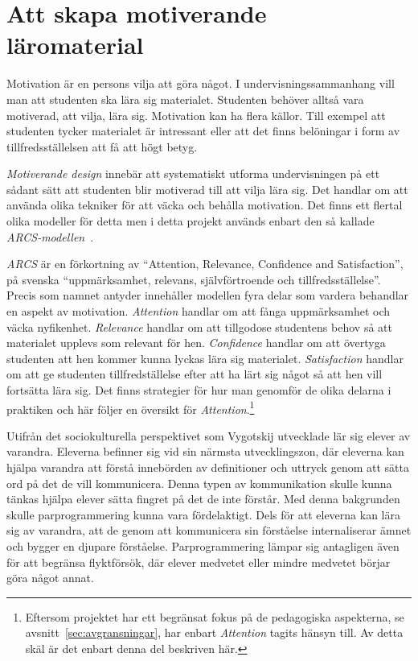 \section{Att skapa motiverande läromaterial}\label{sec:arcs}
\begin{draft}
Motivation är en persons vilja att göra något. I undervisningssammanhang vill
man att studenten ska lära sig materialet. Studenten behöver alltså vara
motiverad, att vilja, lära sig. Motivation kan ha flera källor. Till exempel att
studenten tycker materialet är intressant eller att det finns belöningar i form
av tillfredsställelsen att få att högt betyg. 

\textit{Motiverande design} innebär att systematiskt utforma undervisningen på
ett sådant sätt att studenten blir motiverad till att vilja lära sig. Det handlar om
att använda olika tekniker för att väcka och behålla motivation. Det finns ett
flertal olika modeller för detta men i detta projekt används enbart den så
kallade \textit{ARCS-modellen}~\cite{arcs_book}.

\textit{ARCS} är en förkortning av ``Attention, Relevance, Confidence and
Satisfaction'', på svenska ``uppmärksamhet, relevans, självförtroende och
tillfredsställelse''. Precis som namnet antyder innehåller modellen fyra delar
som vardera behandlar en aspekt av motivation. \textit{Attention} handlar om att
fånga uppmärksamhet och väcka nyfikenhet. \textit{Relevance} handlar om att
tillgodose studentens behov så att materialet upplevs som relevant för hen.
\textit{Confidence} handlar om att övertyga studenten att hen kommer kunna
lyckas lära sig materialet. \textit{Satisfaction} handlar om att ge studenten
tillfredställelse efter att ha lärt sig något så att hen vill fortsätta lära
sig. Det finns strategier för hur man genomför de olika delarna i praktiken och
här följer en översikt för \textit{Attention}.\footnote{Eftersom projektet har
ett begränsat fokus på de pedagogiska aspekterna, se
avsnitt~\ref{sec:avgransningar}, har enbart \textit{Attention}  tagits hänsyn till. Av detta skäl är det enbart denna
del beskriven här.}

Utifrån det sociokulturella perspektivet som Vygotskij utvecklade\cite{LSB_kap5}
lär sig elever av varandra. Eleverna befinner sig vid sin närmsta 
utvecklingszon, där eleverna kan hjälpa varandra att förstå innebörden av
definitioner och uttryck genom att sätta ord på det de vill kommunicera. Denna
typen av kommunikation skulle kunna tänkas hjälpa elever sätta fingret på det de
inte förstår. Med denna bakgrunden skulle parprogrammering kunna vara
fördelaktigt. Dels för att eleverna kan lära sig av varandra, att de genom att
kommunicera sin förståelse internaliserar ämnet och bygger en djupare
förståelse. Parprogrammering lämpar sig antagligen även för att begränsa
flyktförsök, där elever medvetet eller mindre medvetet börjar göra något annat.


\end{draft}
